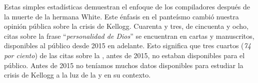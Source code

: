 Estas simples estadísticas demuestran el enfoque de los compiladores después de la muerte de la hermana White. Este énfasis en el panteísmo cambió nuestra opinión pública sobre la crisis de Kellogg. Cuarenta y tres, de cincuenta y ocho, citas sobre la frase “\textit{personalidad de Dios}” se encuentran en cartas y manuscritos, disponibles al público desde 2015 en adelante. Esto significa que tres cuartos (\textit{74 por ciento}) de las citas sobre la , antes de 2015, no estaban disponibles para el público. Antes de 2015 no teníamos muchos datos disponibles para estudiar la crisis de Kellogg a la luz de la  y en su contexto.






